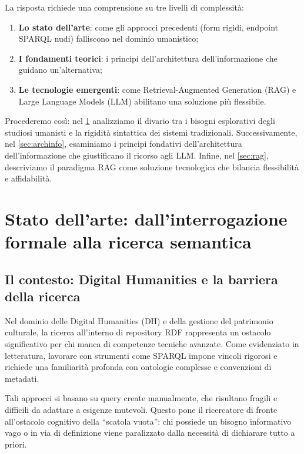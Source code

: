 \documentclass[12pt,a4paper,oneside]{book}
\begin{document}
La risposta richiede una comprensione su tre livelli di complessità:
\begin{enumerate}
    \item \textbf{Lo stato dell'arte}: come gli approcci precedenti (form rigidi, endpoint SPARQL nudi) falliscono nel dominio umanistico;
    \item \textbf{I fondamenti teorici}: i principi dell'architettura dell'informazione che guidano un'alternativa;
    \item \textbf{Le tecnologie emergenti}: come Retrieval-Augmented Generation (RAG) e Large Language Models (LLM) abilitano una soluzione più flessibile.
\end{enumerate}

Procederemo così: nel \cref{sec:statoarte} analizziamo il divario tra i bisogni esplorativi degli studiosi umanisti e la rigidità sintattica dei sistemi tradizionali. Successivamente, nel \cref{sec:archinfo}, esaminiamo i principi fondativi dell'architettura dell'informazione che giustificano il ricorso agli LLM.\@
Infine, nel \cref{sec:rag}, descriviamo il paradigma RAG come soluzione tecnologica che bilancia flessibilità e affidabilità.

\section{Stato dell'arte: dall'interrogazione formale alla ricerca semantica}\label{sec:statoarte}
\subsection{Il contesto: Digital Humanities e la barriera della ricerca}\label{subsec:dh_barrier}

Nel dominio delle Digital Humanities (DH) e della gestione del patrimonio culturale, la ricerca all'interno di repository RDF rappresenta un ostacolo significativo per chi manca di competenze tecniche avanzate.
Come evidenziato in letteratura, lavorare con strumenti come SPARQL impone vincoli rigorosi\cite{Vas25} e richiede una familiarità profonda con ontologie complesse e convenzioni di metadati\cite{Vas24}. 

Tali approcci si basano su query create manualmente, che risultano fragili e difficili da adattare a esigenze mutevoli\cite{Mar25}. Questo pone il ricercatore di fronte all'ostacolo cognitivo della ``scatola vuota'': chi possiede un bisogno informativo vago o in via di definizione viene paralizzato dalla necessità di dichiarare tutto a priori.
\end{document}
